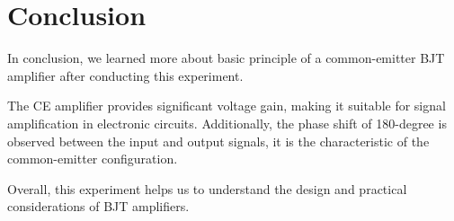 \section{Conclusion}
In conclusion, we learned more about basic principle of a common-emitter BJT amplifier after conducting this experiment.\par
The CE amplifier provides significant voltage gain, making it suitable for signal amplification in electronic circuits. Additionally, the phase shift of 180-degree is observed between the input and output signals, it is the characteristic of the common-emitter configuration.\par
Overall, this experiment helps us to understand the design and practical considerations of BJT amplifiers.